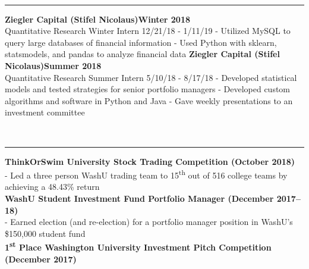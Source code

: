 \documentclass[12pt]{article}
\begin{document}
\begin{titlepage}
\begin{addmargin}[1em]{0em}
\begin{center}
\begin{minipage}[b]{0.3\textwidth}
				\end{minipage}
			\end{center}
		\end{addmargin}
		\vspace{-10pt}
		\noindent
		\\\rule{\textwidth}{0.4pt}
		\begin{addmargin}[1em]{0em}
			\textbf{Ziegler Capital (Stifel Nicolaus)\hfill Winter 2018}\\
Quantitative Research Winter Intern \hfill {\small{12/21/18 - 1/11/19}}\newline
- Utilized MySQL to query large databases of financial information \newline
- Used Python with sklearn, statsmodels, and pandas to analyze financial data\newline
			\textbf{Ziegler Capital (Stifel Nicolaus)\hfill Summer 2018}\\
Quantitative Research Summer Intern \hfill {\small{5/10/18 - 8/17/18}}\newline
- Developed statistical models and tested strategies for senior portfolio managers\newline
- Developed custom algorithms and software in Python and Java\newline
- Gave weekly presentations to an investment committee\newline
		\end{addmargin}
		\vspace{-10pt}
		\noindent
		\\\rule{\textwidth}{0.4pt}
		\begin{addmargin}[1em]{0em}
			\textbf{ThinkOrSwim University Stock Trading Competition \hfill (October 2018)}\\
- Led a three person WashU trading team to 15\textsuperscript{th} out of 516 college teams by achieving a 48.43\% return\\
			\textbf{WashU Student Investment Fund Portfolio Manager \hfill (December 2017–18)}\\
- Earned election (and re-election) for a portfolio manager position in WashU's \$150,000 student fund\\
			\textbf{1\textsuperscript{st} Place Washington University Investment Pitch Competition \hfill (December 2017)}\\

\end{addmargin}
\end{titlepage}
\end{document}
